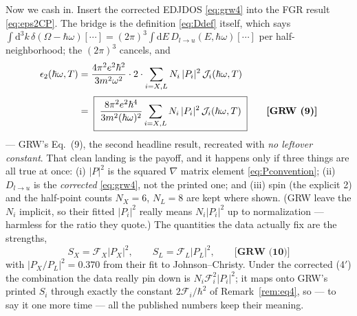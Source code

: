 \documentclass[11pt,a4paper]{article}
\numberwithin{equation}{section}
\newcommand{\hw}{\hbar\omega}
\newcommand{\cF}{\mathcal{F}}
\newcommand{\cJ}{\mathcal{J}}%
\newcommand{\dd}{\mathrm{d}}
\newcommand{\grweq}[1]{\textbf{[GRW~(#1)]}}
\begin{document}
Now we cash in. Insert the corrected EDJDOS \eqref{eq:grw4} into the
FGR result \eqref{eq:eps2CP}. The bridge is the definition
\eqref{eq:Ddef} itself, which says
$\int\dd^3k\,\delta(\Omega-\hw)[\cdots]
=(2\pi)^3\!\int\!\dd E\,D_{l\to u}(E,\hw)[\cdots]$ per
half-neighborhood; the $(2\pi)^3$ cancels, and
\begin{align}
\epsilon_2(\hw,T)
&=\frac{4\pi^2e^2\hbar^2}{3m^2\omega^2}\cdot2\cdot
\sum_{i=X,L}N_i\,|P_i|^2\,\cJ_i(\hw,T)
\notag\\[2pt]
&=\;
\boxed{\;
\frac{8\pi^2e^2\hbar^4}{3m^2(\hw)^2}
\sum_{i=X,L}N_i\,|P_i|^2\,\cJ_i(\hw,T)
\;}\qquad\grweq{9}
\label{eq:grw9}
\end{align}
--- GRW's Eq.~(9), the second headline result, recreated with
\emph{no leftover constant}. That clean landing is the payoff, and it
happens only if three things are all true at once: (i) $|P|^2$ is the
squared $\nabla$ matrix element \eqref{eq:Pconvention}; (ii)
$D_{l\to u}$ is the \emph{corrected} \eqref{eq:grw4}, not the printed
one; and (iii) spin (the explicit 2) and the half-point counts
$N_X=6$, $N_L=8$ are kept where shown. (GRW leave the $N_i$ implicit,
so their fitted $|P_i|^2$ really means $N_i|P_i|^2$ up to
normalization --- harmless for the ratio they quote.) The quantities
the data actually fix are the strengths,
\begin{equation}
S_X=\cF_X|P_X|^2,\qquad S_L=\cF_L|P_L|^2,
\qquad\grweq{10}
\label{eq:grw10}
\end{equation}
with $|P_X/P_L|^2=0.370$ from their fit to Johnson--Christy. Under the
corrected (4$'$) the combination the data really pin down is
$N_i\cF_i^2|P_i|^2$; it maps onto GRW's printed $S_i$ through exactly
the constant $2\cF_i/\hbar^2$ of Remark~\ref{rem:eq4}, so --- to say it
one more time --- all the published numbers keep their meaning.
\end{document}
